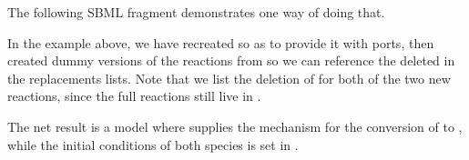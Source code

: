 The following SBML fragment demonstrates one way of doing that.


In the example above, we have recreated  so as to provide it
with ports, then created dummy versions of the reactions from
 so we can reference the deleted  in the
replacements lists.  Note that we list the deletion of 
for both of the two new reactions, since the full reactions still live in
.

The net result is a model where  supplies the mechanism
for the conversion of  to , while the initial conditions of
both species is set in .
